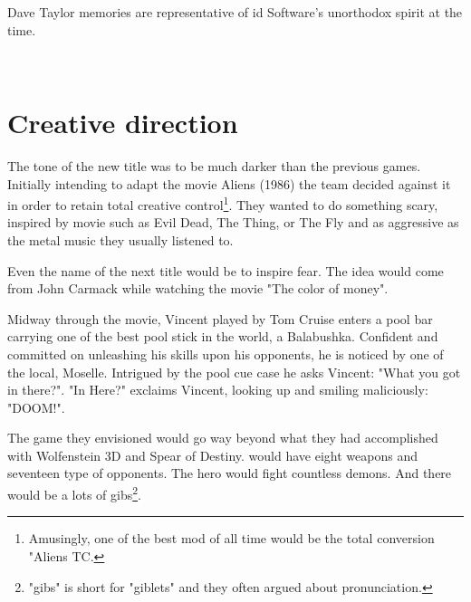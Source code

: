 Dave Taylor memories are representative of id Software's unorthodox spirit at the time.\\
\par
\vspace{11pt}
\\
\par
\vspace{11pt}





\section{Creative direction}
The tone of the new title was to be much darker than the previous games. Initially intending to adapt the movie Aliens (1986) the team decided against it in order to retain total creative control\footnote{Amusingly, one of the best mod of all time would be the total conversion "Aliens TC.}. They wanted to do something scary, inspired by movie such as Evil Dead, The Thing, or The Fly and as aggressive as the metal music they usually listened to.\\
\par
Even the name of the next title would be to inspire fear. The idea would come from John Carmack while watching the movie "The color of money".\\ 
\par
Midway through the movie, Vincent played by Tom Cruise enters a pool bar carrying one of the best pool stick in the world, a Balabushka. Confident and committed on unleashing his skills upon his opponents, he is noticed by one of the local, Moselle. Intrigued by the pool cue case he asks Vincent: "What you got in there?". "In Here?" exclaims Vincent, looking up and smiling maliciously: "DOOM!".\\
\par

\par
{}
\par
\vspace{-5pt}
The game they envisioned would go way beyond what they had accomplished with Wolfenstein 3D and Spear of Destiny. \doom{} would have eight weapons and seventeen type of opponents. The hero would fight countless demons. And there would be a lots of gibs\footnote{"gibs" is short for "giblets" and they often argued about pronunciation.}.

